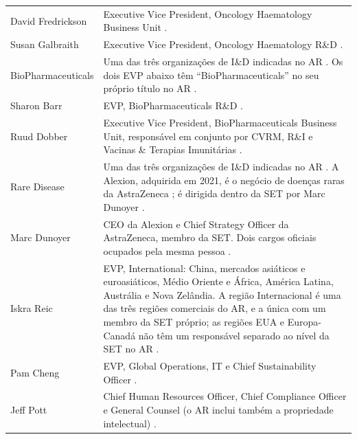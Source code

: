 \begin{xltabular}{\linewidth}{@{}>{\raggedright\arraybackslash}p{3.4cm}Y@{}}
David Fredrickson & Executive Vice President, Oncology Haematology Business Unit \cite[p.~70]{AR}. \\
Susan Galbraith & Executive Vice President, Oncology Haematology R\&D \cite[p.~70]{AR}. \\
BioPharmaceuticals & Uma das três organizações de I\&D indicadas no AR \cite[p.~26]{AR}. Os dois EVP abaixo têm ``BioPharmaceuticals'' no seu próprio título no AR \cite[p.~70]{AR}. \\
Sharon Barr & EVP, BioPharmaceuticals R\&D \cite[p.~70]{AR}. \\
Ruud Dobber & Executive Vice President, BioPharmaceuticals Business Unit, responsável em conjunto por CVRM, R\&I e Vacinas \& Terapias Imunitárias \cite[p.~70]{AR}. \\
Rare Disease & Uma das três organizações de I\&D indicadas no AR \cite[p.~26]{AR}. A Alexion, adquirida em 2021, é o negócio de doenças raras da AstraZeneca \cite[Item~4.A]{F20}; é dirigida dentro da SET por Marc Dunoyer \cite[p.~70]{AR}. \\
Marc Dunoyer & CEO da Alexion e Chief Strategy Officer da AstraZeneca, membro da SET. Dois cargos oficiais ocupados pela mesma pessoa \cite[p.~70]{AR}. \\
Iskra Reic & EVP, International: China, mercados asiáticos e euroasiáticos, Médio Oriente e África, América Latina, Austrália e Nova Zelândia. A região Internacional é uma das três regiões comerciais do AR, e a única com um membro da SET próprio; as regiões EUA e Europa-Canadá não têm um responsável separado ao nível da SET no AR \cite[pp.~32, 70]{AR}. \\
Pam Cheng & EVP, Global Operations, IT e Chief Sustainability Officer \cite[p.~70]{AR}. \\
Jeff Pott & Chief Human Resources Officer, Chief Compliance Officer e General Counsel (o AR inclui também a propriedade intelectual) \cite[p.~70]{AR}. \\
\end{xltabular}

